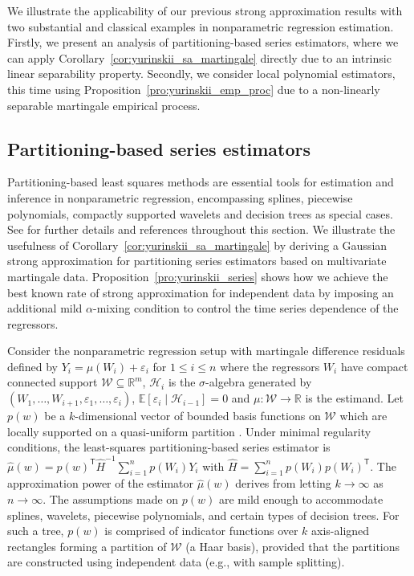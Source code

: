 \documentclass[11pt,lof]{puthesis}
\newcommand{\R}{\ensuremath{\mathbb{R}}}
\newcommand{\E}{\ensuremath{\mathbb{E}}}
\newcommand{\cH}{\ensuremath{\mathcal{H}}}
\newcommand{\cW}{\ensuremath{\mathcal{W}}}
\newcommand{\T}{\ensuremath{\mathsf{T}}}
\theoremstyle{break}
\theoremstyle{proof}
\begin{document}
We illustrate the applicability of our previous strong approximation results
with two substantial and classical examples in nonparametric regression
estimation. Firstly, we present an analysis of partitioning-based series
estimators, where we can apply Corollary~\ref{cor:yurinskii_sa_martingale}
directly due to an intrinsic linear separability property. Secondly, we
consider local polynomial estimators, this time using
Proposition~\ref{pro:yurinskii_emp_proc} due to a non-linearly separable
martingale empirical process.

\subsection{Partitioning-based series estimators}
\label{sec:yurinskii_series}

Partitioning-based least squares methods are essential tools for estimation and
inference in nonparametric regression, encompassing splines, piecewise
polynomials, compactly supported wavelets and decision trees as special cases.
See \citet{cattaneo2020large} for further details and references throughout
this section. We illustrate the usefulness of
Corollary~\ref{cor:yurinskii_sa_martingale}
by deriving a Gaussian strong approximation for partitioning series estimators
based on multivariate martingale data. Proposition~\ref{pro:yurinskii_series}
shows how
we achieve the best known rate of strong approximation for independent data by
imposing an additional mild $\alpha$-mixing condition to control the time
series dependence of the regressors.

Consider the nonparametric regression setup with martingale difference
residuals defined by $Y_i = \mu(W_i) + \varepsilon_i$ for $ 1 \leq i \leq n$
where the regressors $W_i$ have compact connected support $\cW \subseteq \R^m$,
$\cH_i$ is the $\sigma$-algebra generated by
$(W_1, \ldots, W_{i+1}, \varepsilon_1, \ldots, \varepsilon_i)$,
$\E[\varepsilon_i \mid \cH_{i-1}] = 0$ and $\mu: \cW \to \R$ is the estimand.
Let $p(w)$ be a $k$-dimensional vector of bounded basis functions on $\cW$
which are locally supported on a quasi-uniform partition
\citep[Assumption~2]{cattaneo2020large}. Under minimal regularity conditions,
the least-squares partitioning-based series estimator is
$\hat\mu(w) = p(w)^{\T} \hat H^{-1} \sum_{i=1}^n p(W_i) Y_i$
with $\hat H = \sum_{i=1}^n p(W_i) p(W_i)^\T$.
The approximation power of the estimator $\hat\mu(w)$ derives from letting
$k\to\infty$ as $n\to\infty$. The assumptions made on $p(w)$ are mild enough to
accommodate splines, wavelets, piecewise polynomials, and certain types of
decision trees. For such a tree, $p(w)$ is comprised of indicator functions
over $k$ axis-aligned rectangles forming a partition of $\cW$ (a Haar basis),
provided that the partitions are constructed using independent data
(e.g., with sample splitting).
\end{document}
